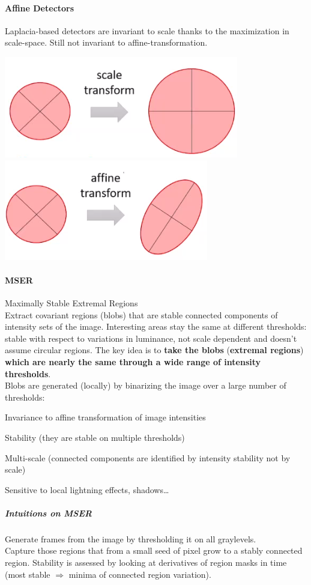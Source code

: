 \documentclass[10pt]{report}
\begin{document}
\paragraph{Affine Detectors} Laplacia-based detectors are invariant to scale thanks to the maximization in scale-space. Still not invariant to affine-transformation.
\begin{center}
	\includegraphics[scale=0.5]{7.png}\\
	\includegraphics[scale=0.5]{8.png}
\end{center}
\paragraph{MSER} Maximally Stable Extremal Regions\\
Extract covariant regions (blobs) that are stable connected components of intensity sets of the image. Interesting areas stay the same at different thresholds: stable with respect to variations in luminance, not scale dependent and doesn't assume circular regions. The key idea is to \textbf{take the blobs} (\textbf{extremal regions}) \textbf{which are nearly the same through a wide range of intensity thresholds}.\\
Blobs are generated (locally) by binarizing the image over a large number of thresholds:\begin{list}{}{}
	\item Invariance to affine transformation of image intensities
	\item Stability (they are stable on multiple thresholds)
	\item Multi-scale (connected components are identified by intensity stability not by scale)
	\item Sensitive to local lightning effects, shadows\ldots
\end{list}
\subparagraph{Intuitions on MSER} Generate frames from the image by thresholding it on all graylevels.\\
Capture those regions that from a small seed of pixel grow to a stably connected region. Stability is assessed by looking at derivatives of region masks in time (most stable $\Rightarrow$ minima of connected region variation).
\end{document}
